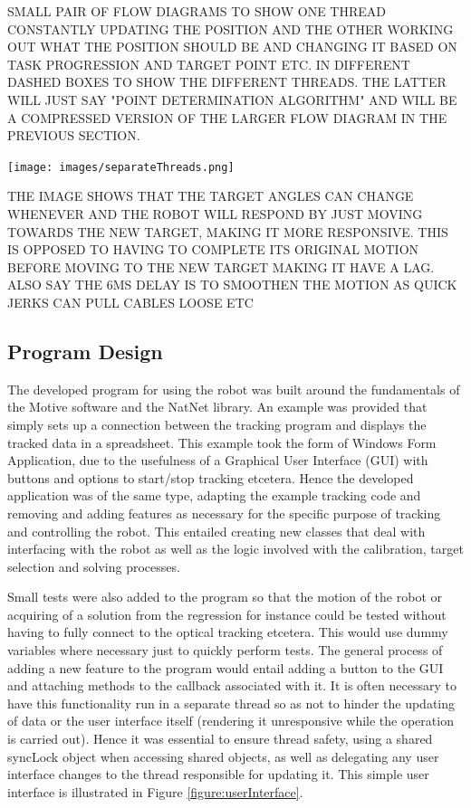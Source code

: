 \documentclass[11pt]{article}
\begin{document}
SMALL PAIR OF FLOW DIAGRAMS TO SHOW ONE THREAD CONSTANTLY UPDATING THE POSITION AND THE OTHER WORKING OUT WHAT THE POSITION SHOULD BE AND CHANGING IT BASED ON TASK PROGRESSION AND TARGET POINT ETC. IN DIFFERENT DASHED BOXES TO SHOW THE DIFFERENT THREADS. THE LATTER WILL JUST SAY "POINT DETERMINATION ALGORITHM" AND WILL BE  A COMPRESSED VERSION OF THE LARGER FLOW DIAGRAM IN THE PREVIOUS SECTION.

\begin{center}
\texttt{[image: images/separateThreads.png]}
\label{figure:separateThreads}
\end{center}

THE IMAGE SHOWS THAT THE TARGET ANGLES CAN CHANGE WHENEVER AND THE ROBOT WILL RESPOND BY JUST MOVING TOWARDS THE NEW TARGET, MAKING IT MORE RESPONSIVE. THIS IS OPPOSED TO HAVING TO COMPLETE ITS ORIGINAL MOTION BEFORE MOVING TO THE NEW TARGET MAKING IT HAVE A LAG. ALSO SAY THE 6MS DELAY IS TO SMOOTHEN THE MOTION AS QUICK JERKS CAN PULL CABLES LOOSE ETC

\subsection{Program Design}
The developed program for using the robot was built around the fundamentals of the Motive software and the NatNet library. An example was provided that simply sets up a connection between the tracking program and displays the tracked data in a spreadsheet. This example took the form of Windows Form Application, due to the usefulness of a Graphical User Interface (GUI) with buttons and options to start/stop tracking etcetera. Hence the developed application was of the same type, adapting the example tracking code and removing and adding features as necessary for the specific purpose of tracking and controlling the robot. This entailed creating new classes that deal with interfacing with the robot as well as the logic involved with the calibration, target selection and solving processes. 

Small tests were also added to the program so that the motion of the robot or acquiring of a solution from the regression for instance could be tested without having to fully connect to the optical tracking etcetera. This would use dummy variables where necessary just to quickly perform tests. The general process of adding a new feature to the program would entail adding a button to the GUI and attaching methods to the callback associated with it. It is often necessary to have this functionality run in a separate thread so as not to hinder the updating of data or the user interface itself (rendering it unresponsive while the operation is carried out). Hence it was essential to ensure thread safety, using a shared syncLock object when accessing shared objects, as well as delegating any user interface changes to the thread responsible for updating it. This simple user interface is illustrated in Figure \ref{figure:userInterface}.
\end{document}
